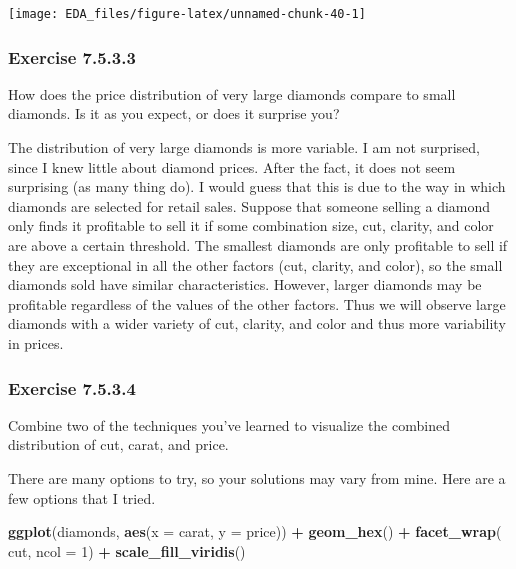 \documentclass[]{book}
\newenvironment{Shaded}{\begin{snugshade}}{\end{snugshade}}
\newcommand{\DataTypeTok}[1]{\textcolor[rgb]{0.13,0.29,0.53}{#1}}
\newcommand{\DecValTok}[1]{\textcolor[rgb]{0.00,0.00,0.81}{#1}}
\newcommand{\KeywordTok}[1]{\textcolor[rgb]{0.13,0.29,0.53}{\textbf{#1}}}
\newcommand{\NormalTok}[1]{#1}
\newcommand{\OperatorTok}[1]{\textcolor[rgb]{0.81,0.36,0.00}{\textbf{#1}}}
\newcommand{\StringTok}[1]{\textcolor[rgb]{0.31,0.60,0.02}{#1}}
\theoremstyle{plain}
\theoremstyle{remark}
\theoremstyle{definition}
\theoremstyle{definition}
\theoremstyle{definition}
\theoremstyle{remark}
\begin{document}
\begin{center}\texttt{[image: EDA\_files/figure-latex/unnamed-chunk-40-1]} \end{center}

\hypertarget{exercise-7.5.3.3}{%
\subsubsection*{\texorpdfstring{Exercise
{7.5.3.3}}{Exercise 7.5.3.3}}\label{exercise-7.5.3.3}}

How does the price distribution of very large diamonds compare to small
diamonds. Is it as you expect, or does it surprise you?

The distribution of very large diamonds is more variable. I am not
surprised, since I knew little about diamond prices. After the fact, it
does not seem surprising (as many thing do). I would guess that this is
due to the way in which diamonds are selected for retail sales. Suppose
that someone selling a diamond only finds it profitable to sell it if
some combination size, cut, clarity, and color are above a certain
threshold. The smallest diamonds are only profitable to sell if they are
exceptional in all the other factors (cut, clarity, and color), so the
small diamonds sold have similar characteristics. However, larger
diamonds may be profitable regardless of the values of the other
factors. Thus we will observe large diamonds with a wider variety of
cut, clarity, and color and thus more variability in prices.

\hypertarget{exercise-7.5.3.4}{%
\subsubsection*{\texorpdfstring{Exercise
{7.5.3.4}}{Exercise 7.5.3.4}}\label{exercise-7.5.3.4}}

Combine two of the techniques you've learned to visualize the combined
distribution of cut, carat, and price.

There are many options to try, so your solutions may vary from mine.
Here are a few options that I tried.

\begin{Shaded}
\begin{Highlighting}[]
\KeywordTok{ggplot}\NormalTok{(diamonds, }\KeywordTok{aes}\NormalTok{(}\DataTypeTok{x =}\NormalTok{ carat, }\DataTypeTok{y =}\NormalTok{ price)) }\OperatorTok{+}
\StringTok{  }\KeywordTok{geom_hex}\NormalTok{() }\OperatorTok{+}
\StringTok{  }\KeywordTok{facet_wrap}\NormalTok{(}\OperatorTok{~}\StringTok{ }\NormalTok{cut, }\DataTypeTok{ncol =} \DecValTok{1}\NormalTok{) }\OperatorTok{+}
\StringTok{  }\KeywordTok{scale_fill_viridis}\NormalTok{()}
\end{Highlighting}
\end{Shaded}
\end{document}

